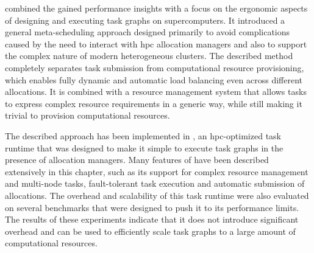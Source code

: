  combined the gained performance insights with a focus on
the ergonomic aspects of designing and executing task graphs on supercomputers. It introduced a
general meta-scheduling approach designed primarily to avoid complications caused by the need to
interact with \gls{hpc} allocation managers and also to support the complex nature
of modern heterogeneous clusters. The described method completely separates task submission from
computational resource provisioning, which enables fully dynamic and automatic load balancing even
across different allocations. It is combined with a resource management system that allows tasks to
express complex resource requirements in a generic way, while still making it trivial to provision
computational resources.

The described approach has been implemented in \hyperqueue{}, an
\gls{hpc}-optimized task runtime that was designed to make it simple to execute
task graphs in the presence of allocation managers. Many features of \hyperqueue{}
have been described extensively in this chapter, such as its support for complex resource
management and multi-node tasks, fault-tolerant task execution and automatic submission of
allocations. The overhead and scalability of this task runtime were also evaluated on several
benchmarks that were designed to push it to its performance limits. The results of these
experiments indicate that it does not introduce significant overhead and can be used to efficiently
scale task graphs to a large amount of computational resources.

